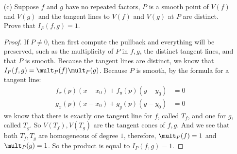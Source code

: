 \documentclass{article}
\begin{document}
\begin{itemize}
        \item [(c)] Suppose $f$ and $g$ have no repeated factors, $P$ is a smooth point of $V(f)$ and $V(g)$ and the tangent lines to $V(f)$ and $V(g)$ at $P$ are distinct. Prove that $I_{P}(f, g) = 1$. 
            \begin{proof}
                If $P \neq 0$, then first compute the pullback and everything will be preserved, such as the multiplicity of $P$ in $f, g$, the distinct tangent lines, and that $P$ is smooth. Because the tangent lines are distinct, we know that $I_{P}(f, g) = \mult_{P}(f)\mult_{P}(g)$. Because $P$ is smooth, by the formula for a tangent line:
                    \begin{align*}
                        f_{x}(p)(x - x_{0}) + f_{y}(p)(y - y_{0}) &= 0 \\
                        g_{x}(p)(x - x_{0}) + g_{y}(p)(y - y_{0}) &= 0   
                    \end{align*}
                we know that there is exactly one tangent line for $f$, called $T_{f}$, and one for $g$, called $T_{g}$. So $V(T_{f}), V(T_{g})$ are the tangent cones of $f, g$. And we see that both $T_{f}, T_{g}$ are homogeneous of degree $1$, therefore, $\mult_{P}(f) = 1$ and $\mult_{P}(g) = 1$. So the product is equal to $I_{P}(f, g) = 1$.
            \end{proof}
    \end{itemize}
\end{document}

